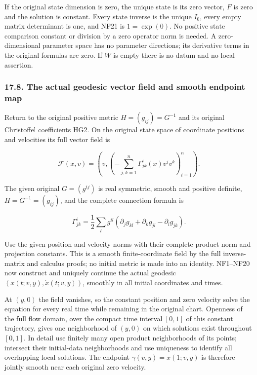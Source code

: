 \documentclass[
  11pt,
]{article}
\begin{document}
If the original state dimension is zero, the unique state is its zero
vector, \(F\) is zero and the solution is constant. Every state inverse
is the unique \(I_0\), every empty matrix determinant is one, and NF21
is \(1=\exp(0)\). No positive state comparison constant or division by a
zero operator norm is needed. A zero-dimensional parameter space has no
parameter directions; its derivative terms in the original formulas are
zero. If \(W\) is empty there is no datum and no local assertion.

\subsubsection{17.8. The actual geodesic vector field and smooth
endpoint
map}\label{the-actual-geodesic-vector-field-and-smooth-endpoint-map}

Return to the original positive metric \(H=(g_{ij})=G^{-1}\) and its
original Christoffel coefficients HG2. On the original state space of
coordinate positions and velocities its full vector field is

\[
 \mathcal F(x,v)=
 \left(v,\left(-\sum_{j,k=1}^n
                       \Gamma^i_{jk}(x)v^jv^k\right)_{i=1}^n\right).
 \tag{NG1}
\]

The given original \(G=(g^{ij})\) is real symmetric, smooth and positive
definite, \(H=G^{-1}=(g_{ij})\), and the complete connection formula is

\[
 \Gamma^i_{jk}=\frac12\sum_l g^{il}
             (\partial_jg_{kl}+\partial_kg_{jl}-\partial_lg_{jk}).
                                                                    \tag{NG0}
\]

Use the given position and velocity norms with their complete product
norm and projection constants. This is a smooth finite-coordinate field
by the full inverse-matrix and calculus proofs; no initial metric is
made into an identity. NF1--NF20 now construct and uniquely continue the
actual geodesic \((x(t;v,y),\dot x(t;v,y))\), smoothly in all initial
coordinates and times.

At \((y,0)\) the field vanishes, so the constant position and zero
velocity solve the equation for every real time while remaining in the
original chart. Openness of the full flow domain, over the compact time
interval \([0,1]\) of this constant trajectory, gives one neighborhood
of \((y,0)\) on which solutions exist throughout \([0,1]\). In detail
use finitely many open product neighborhoods of its points; intersect
their initial-data neighborhoods and use uniqueness to identify all
overlapping local solutions. The endpoint \(\gamma(v,y)=x(1;v,y)\) is
therefore jointly smooth near each original zero velocity.
\end{document}
